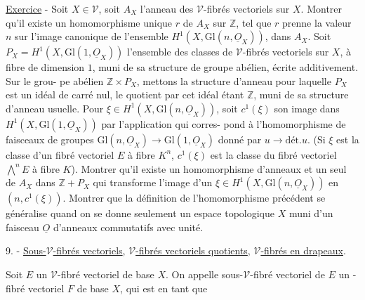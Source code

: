 \underline{Exercice} - Soit $X \in \mathcal{V}$, soit $A_X$ l'anneau des $\mathcal{V}$-fibrés vectoriels
sur $X$. Montrer qu'il existe un homomorphisme unique $r$ de $A_X$ sur $\mathbb{Z}$,
tel que $r$ prenne la valeur $n$ sur l'image canonique de l'ensemble
$H^1(X, \mathrm{Gl}(n, \underline{O}_X))$, dans $A_X$. Soit $P_X = H^1(X, \mathrm{Gl}(1, \underline{O}_X))$ l'ensemble des
classes de $\mathcal{V}$-fibrés vectoriels sur $X$, à fibre de dimension $1$, muni
de sa structure de groupe abélien, écrite additivement. Sur le grou-
pe abélien $\mathbb{Z} \times P_X$, mettons la structure d'anneau pour laquelle $P_X$
est un idéal de carré nul, le quotient par cet idéal étant $\mathbb{Z}$, muni
de sa structure d'anneau usuelle. Pour $\xi \in H^1(X, \mathrm{Gl}(n, \underline{O}_X))$, soit
$c^1(\xi)$ son image dans $H^1(X, \mathrm{Gl}(1, \underline{O}_X))$ par l'application qui corres-
pond à l'homomorphisme de faisceaux de groupes $\mathrm{Gl}(n, \underline{O}_X) \rightarrow \mathrm{Gl}(1, \underline{O}_X)$
donné par $u \rightarrow \text{dét.} u$. (Si $\xi$ est la classe d'un fibré vectoriel $E$
à fibre $K^n$, $c^1(\xi)$ est la classe du fibré vectoriel $\bigwedge^n E$ à fibre $K$).
Montrer qu'il existe un homomorphisme d'anneaux et un seul de $A_X$
dans $\mathbb{Z} + P_X$ qui transforme l'image d'un $\xi \in H^1(X, \mathrm{Gl}(n, \underline{O}_X))$ en
$(n, c^1(\xi))$. Montrer que la définition de l'homomorphisme précédent
se généralise quand on se donne seulement un espace topologique $X$
muni d'un faisceau $\underline{O}$ d'anneaux commutatifs avec unité.

9. - \underline{Sous-$\mathcal{V}$-fibrés vectoriels}, \underline{$\mathcal{V}$-fibrés vectoriels quotients}, 
\underline{$\mathcal{V}$-fibrés en drapeaux}.

Soit $E$ un $\mathcal{V}$-fibré vectoriel de base $X$. On appelle sous-$\mathcal{V}$-fibré
vectoriel de $E$ un -fibré vectoriel $F$ de base $X$, qui est en tant que

\newpage



